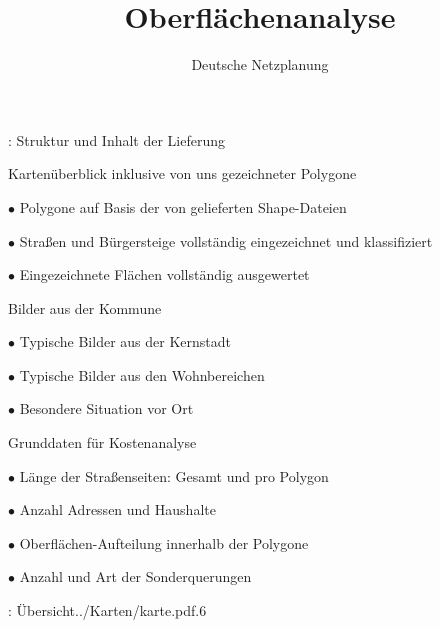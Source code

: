 \documentclass[11pt, dvipsnames,aspectratio=169]{beamer}
\author[DNP]{Deutsche Netzplanung}
\title[Oberflächenanalyse \Ort{} (\Kreis, \Land)]{\textbf{Oberflächenanalyse} \\ \Ort}
\date{\Abgabedatum}
\begin{document}
{
	\maketitle
}

\begin{frame}{\Ort: Struktur und Inhalt der Lieferung}
	\begin{bulletlist}{5pt}
		\item Kartenüberblick inklusive von uns gezeichneter Polygone
			\begin{bulletlist}{3pt}
				\item[$\bullet$] Polygone auf Basis der von \Kunde{} gelieferten Shape-Dateien
				\item[$\bullet$] Straßen und Bürgersteige vollständig eingezeichnet und klassifiziert
				\item[$\bullet$] Eingezeichnete Flächen vollständig ausgewertet
			\end{bulletlist}
		\item Bilder aus der Kommune
		\begin{bulletlist}{3pt}
			\item[$\bullet$] Typische Bilder aus der Kernstadt
			\item[$\bullet$] Typische Bilder aus den Wohnbereichen
			\item[$\bullet$] Besondere Situation vor Ort
		\end{bulletlist}
		\item Grunddaten für Kostenanalyse
		\begin{bulletlist}{3pt}
			\item[$\bullet$] Länge der Straßenseiten: Gesamt und pro Polygon
			\item[$\bullet$] Anzahl Adressen und Haushalte
			\item[$\bullet$] Oberflächen-Aufteilung innerhalb der Polygone
			\item[$\bullet$] Anzahl und Art der Sonderquerungen
		\end{bulletlist}
	\end{bulletlist}
\end{frame}

\begin{mapframe}{\Ort: Übersicht}{../Karten/karte.pdf}{.6\linewidth}
	\scriptsize
	\begin{itemize}
		\surfacetypes
	\end{itemize}
\end{mapframe}
\end{document}
